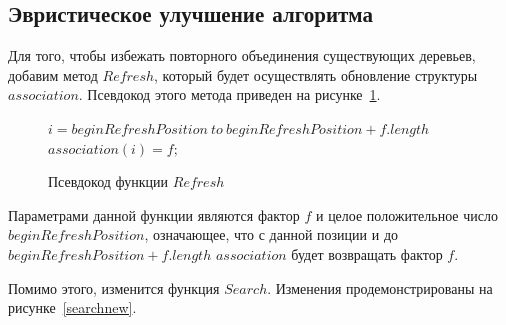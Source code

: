 \documentclass[12pt,a4paper]{extarticle}
\theoremstyle{break}
\begin{document}
\newpage 
\subsection{Эвристическое улучшение алгоритма}

Для того, чтобы избежать повторного объединения существующих деревьев, добавим
метод $Refresh$, который будет осуществлять обновление структуры $association$.
Псевдокод этого метода приведен на рисунке~\ref{refresh}.

\begin{figure}[!h]
	\begin{center}
	  \begin{varwidth}{\linewidth}
		\begin{codebox}
				\li \For $i = beginRefreshPosition\ to\ beginRefreshPosition + f.length$
				\li		\Do
				\li			$association(i) = f;$
				\End
		\end{codebox}
		\caption{Псевдокод функции $Refresh$}
		\label{refresh}
	  \end{varwidth}
	\end{center}
\end{figure}

Параметрами данной функции являются фактор $f$ и целое положительное число
$beginRefreshPosition$, означающее, что с данной позиции и до
$beginRefreshPosition + f.length$ $association$ будет возвращать фактор $f$.

Помимо этого, изменится функция $Search$. Изменения продемонстрированы на
рисунке~\ref{searchnew}.
\end{document}
